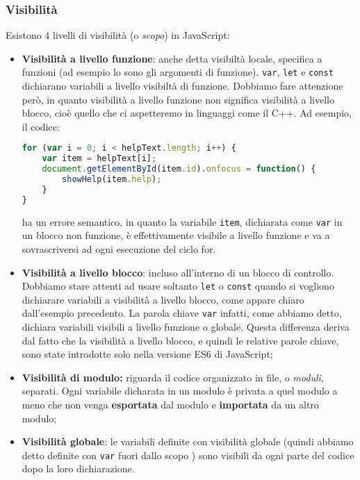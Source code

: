 \documentclass[a4paper,11pt]{article}
\begin{document}
\subsubsection{Visibilità}
Esistono 4 livelli di visibilità (o \textit{scopo}) in JavaScript:
\begin{itemize}
	\item \textbf{Visibilità a livello funzione}: anche detta visibiltà locale, specifica a funzioni (ad esempio lo sono gli argomenti di funzione). \lstinline|var|, \lstinline|let| e \lstinline|const| dichiarano variabili a livello visibiltà di funzione. Dobbiamo fare attenzione però, in quanto visibilità a livello funzione non significa visibilità a livello blocco, cioè quello che ci aspetteremo in linguaggi come il C++. Ad esempio, il codice:
\begin{lstlisting}[language=javascript, style=codestyle]	
for (var i = 0; i < helpText.length; i++) {
	var item = helpText[i];
	document.getElementById(item.id).onfocus = function() {
		showHelp(item.help);
	}
}
\end{lstlisting}
ha un errore semantico, in quanto la variabile \lstinline|item|, dichiarata come \lstinline|var| in un blocco non funzione, è effettivamente visibile a livello funzione e va a sovrascriversi ad ogni esecuzione del ciclo for. 

	\item \textbf{Visibilità a livello blocco}: incluso all'interno di un blocco di controllo.
		Dobbiamo stare attenti ad usare soltanto \lstinline|let| o \lstinline|const| quando si vogliono dichiarare variabili a visibilità a livello blocco, come appare chiaro dall'esempio precedento. La parola chiave \lstinline|var| infatti, come abbiamo detto, dichiara variabili visibili a livello funzione o globale.
		Questa differenza deriva dal fatto che la visibilità a livello blocco, e quindi le relative parole chiave, sono state introdotte solo nella versione ES6 di JavaScript;
	\item \textbf{Visibilità di modulo:} riguarda il codice organizzato in file, o \textit{moduli}, separati. Ogni variabile dicharata in un modulo è privata a quel modulo a meno che non venga \textbf{esportata} dal modulo e \textbf{importata} da un altro modulo;
	\item \textbf{Visibilità globale}: le variabili definite con visibilità globale (quindi abbiamo detto definite con \lstinline|var| fuori dallo scopo ) sono visibili da ogni parte del codice dopo la loro dichiarazione.
\end{itemize}
\end{document}
